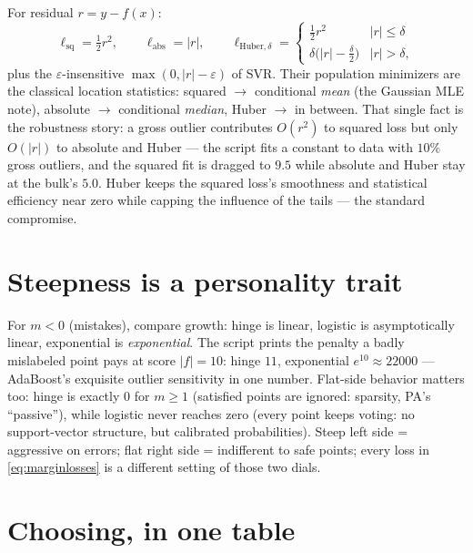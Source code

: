\documentclass[11pt]{article}
\begin{document}
For residual $r = y - f(x)$:
\begin{equation}
  \ell_{\mathrm{sq}} = \tfrac12 r^2,
  \qquad
  \ell_{\mathrm{abs}} = |r|,
  \qquad
  \ell_{\mathrm{Huber},\delta} =
  \begin{cases}
    \tfrac12 r^2 & |r| \le \delta\\[2pt]
    \delta\bigl(|r| - \tfrac{\delta}{2}\bigr) & |r| > \delta ,
  \end{cases}
  \label{eq:reglosses}
\end{equation}
plus the $\varepsilon$-insensitive $\max(0, |r|-\varepsilon)$ of SVR.
Their population minimizers are the classical location statistics:
squared $\to$ conditional \emph{mean} (the Gaussian MLE note), absolute
$\to$ conditional \emph{median}, Huber $\to$ in between. That single
fact is the robustness story: a gross outlier contributes $O(r^2)$ to
squared loss but only $O(|r|)$ to absolute and Huber --- the script fits
a constant to data with $10\%$ gross outliers, and the squared fit is
dragged to $9.5$ while absolute and Huber stay at the bulk's $5.0$.
Huber keeps the squared loss's smoothness and statistical efficiency
near zero while capping the influence of the tails --- the standard
compromise.

\section{Steepness is a personality trait}

For $m < 0$ (mistakes), compare growth: hinge is linear, logistic is
asymptotically linear, exponential is \emph{exponential}. The script
prints the penalty a badly mislabeled point pays at score $|f| = 10$:
hinge $11$, exponential $e^{10} \approx 22000$ --- AdaBoost's
exquisite outlier sensitivity in one number. Flat-side behavior matters
too: hinge is exactly $0$ for $m \ge 1$ (satisfied points are ignored:
sparsity, PA's ``passive''), while logistic never reaches zero (every
point keeps voting: no support-vector structure, but calibrated
probabilities). Steep left side = aggressive on errors; flat right side
= indifferent to safe points; every loss in \eqref{eq:marginlosses} is a
different setting of those two dials.

\section{Choosing, in one table}
\end{document}
